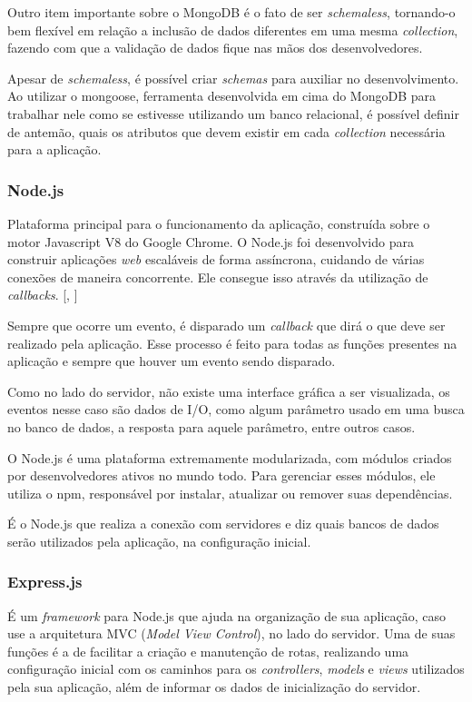 \documentclass[
	12pt,				%
	oneside,			%
	a4paper,			%
	brazil				%
]{abntex2}
\newcommand{\citecustom}[1]{[\citeauthoronline{#1}, \citeyear{#1}]}
\begin{document}
Outro item importante sobre o MongoDB é o fato de ser \textit{schemaless}, tornando-o bem flexível em relação a inclusão de dados diferentes em uma mesma \textit{collection}, fazendo com que a validação de dados fique nas mãos dos desenvolvedores.

Apesar de \textit{schemaless}, é possível criar \textit{schemas} para auxiliar no desenvolvimento. Ao utilizar o mongoose, ferramenta desenvolvida em cima do MongoDB para trabalhar nele como se estivesse utilizando um banco relacional, é possível definir de antemão, quais os atributos que devem existir em cada \textit{collection} necessária para a aplicação.


\subsubsection{Node.js}

Plataforma principal para o funcionamento da aplicação, construída sobre o motor Javascript V8 do Google Chrome.
O Node.js foi desenvolvido para construir aplicações \textit{web} escaláveis de forma assíncrona, cuidando de várias conexões de maneira concorrente. Ele consegue isso através da utilização de \textit{callbacks}. \citecustom{Node2016}

Sempre que ocorre um evento, é disparado um \textit{callback} que dirá o que deve ser realizado pela aplicação. Esse processo é feito para todas as funções presentes na aplicação e sempre que houver um evento sendo disparado.

Como no lado do servidor, não existe uma interface gráfica a ser visualizada, os eventos nesse caso são dados de I/O, como algum parâmetro usado em uma busca no banco de dados, a resposta para aquele parâmetro, entre outros casos.

O Node.js é uma plataforma extremamente modularizada, com módulos criados por desenvolvedores ativos no mundo todo. Para gerenciar esses módulos, ele utiliza o npm, responsável por instalar, atualizar ou remover suas dependências. 

É o Node.js que realiza a conexão com servidores e diz quais bancos de dados serão utilizados pela aplicação, na configuração inicial.


\subsubsection{Express.js}

É um \textit{framework} para Node.js que ajuda na organização de sua aplicação, caso use a arquitetura MVC (\textit{Model View Control}), no lado do servidor. Uma de suas funções é a de facilitar a criação e manutenção de rotas, realizando uma configuração inicial com os caminhos para os \textit{controllers}, \textit{models} e \textit{views} utilizados pela sua aplicação, além de informar os dados de inicialização do servidor.
\end{document}
